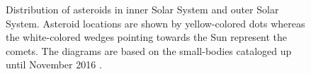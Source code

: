 \begin{figure}[htb]
\centering
\captionsetup{justification=centering}
\caption{Distribution of asteroids in \protect{} inner Solar System and \protect{} outer Solar System. Asteroid locations are shown by yellow-colored dots whereas the white-colored wedges pointing towards the Sun represent the comets. The diagrams are based on the small-bodies cataloged up until November 2016 \parencite{jpl_asteroid_web}.}
\label{fig:asteroid_distribution}
\end{figure}
\FloatBarrier
